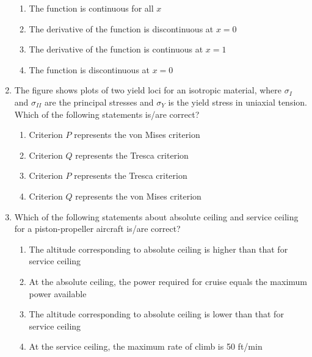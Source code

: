\documentclass[journal,12pt,onecolumn]{IEEEtran}
\theoremstyle{remark}
\begin{document}
\begin{enumerate}
    \begin{enumerate}
        \item The function is continuous for all $x$
        \item The derivative of the function is discontinuous at $x = 0$
        \item The derivative of the function is continuous at $x = 1$
        \item The function is discontinuous at $x = 0$
    \end{enumerate}
    
    \item The figure shows plots of two yield loci for an isotropic material, where $\sigma_I$ and $\sigma_{II}$ are the principal stresses and $\sigma_Y$ is the yield stress in uniaxial tension. Which of the following statements is/are correct?
    
    \begin{figure}[H]
        \centering
        
    \end{figure}
    
    \begin{enumerate}
        \item Criterion $P$ represents the von Mises criterion
        \item Criterion $Q$ represents the Tresca criterion
        \item Criterion $P$ represents the Tresca criterion
        \item Criterion $Q$ represents the von Mises criterion
    \end{enumerate}
    
    \item Which of the following statements about absolute ceiling and service ceiling for a piston-propeller aircraft is/are correct?
    
    \begin{enumerate}
        \item The altitude corresponding to absolute ceiling is higher than that for service ceiling
        \item At the absolute ceiling, the power required for cruise equals the maximum power available
        \item The altitude corresponding to absolute ceiling is lower than that for service ceiling
        \item At the service ceiling, the maximum rate of climb is 50 ft/min
    \end{enumerate}
    

\end{enumerate}
\end{document}
